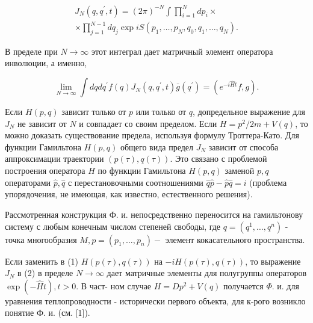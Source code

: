 \documentclass[10pt]{article}
\begin{document}
\[

\begin{gathered}

J_{N}\left(q, q^{\prime}, t\right)=(2 \pi)^{-N} \int \prod_{i=1}^{N} d p_{i} \times \\

\times \prod_{j=1}^{N-1} d q_{j} \exp i S\left(p_{1}, \ldots, p_{N}, q_{0}, q_{1}, \ldots, q_{N}\right) .

\end{gathered}

\]



В пределе при $N \rightarrow \infty$ этот интеграл дает матричный элемент оператора инволюции, а именно,



\[

\lim _{N \rightarrow \infty} \int d q d q^{\prime} f(q) J_{N}\left(q, q^{\prime}, t\right) \bar{g}\left(q^{\prime}\right)=\left(e^{-i \hat{H} t} f, g\right) .

\]



Если $H(p, q)$ зависит только от $p$ или только от $q$, допредельное выражение для $J_{N}$ не зависит от $N$ и совпадает со своим пределом. Если $H=p^{2} / 2 m+V(q)$, то можно доказать существование предела, используя формулу Троттера-Като. Для функции Гамильтона $H(p, q)$ общего вида предел $J_{N}$ зависит от способа аппроксимации траектории $(p(\tau), q(\tau))$. Это связано с проблемой построения оператора $\hat{H}$ по функции Гамильтона $H(p, q)$ заменой $p, q$ операторами $\hat{p}, \hat{q}$ с перестановочными соотношениями $\hat{q} \hat{p}-\hat{p} \hat{q}=i$ (проблема упорядочения, не имеющая, как известно, естественного решения).



Рассмотренная конструкция Ф. и. непосредственно переносится на гамильтонову систему с любым конечным числом степеней свободы, где $q=\left(q^{1}, \ldots, q^{n}\right)$ - точка многообразия $M, p=\left(p_{1}, \ldots, p_{n}\right)-$ элемент кокасательного пространства.



Если заменить в (1) $H(p(\tau), q(\tau))$ на $-i H(p(\tau), q(\tau))$, то выражение $J_{N}$ в (2) в пределе $N \rightarrow \infty$ дает матричные элементы для полугруппы операторов $\exp (-\hat{H} t), t>0$. В част- ном случае $H=D p^{2}+V(q)$ получается $\Phi$. и. для уравнения теплопроводности - исторически первого объекта, для к-рого возникло понятие Ф. и. (см. [1]).
\end{document}
